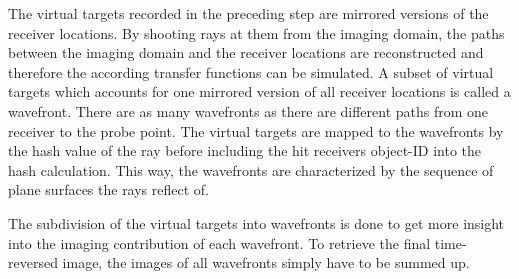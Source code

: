 The virtual targets recorded in the preceding step are mirrored versions of the receiver locations.
By shooting rays at them from the imaging domain, the paths between the imaging domain and the receiver locations are reconstructed and therefore the according transfer functions can be simulated.
A subset of virtual targets which accounts for one mirrored version of all receiver locations is called a wavefront.
There are as many wavefronts as there are different paths from one receiver to the probe point.
The virtual targets are mapped to the wavefronts by the hash value of the ray before including the hit receivers object-ID into the hash calculation.
This way, the wavefronts are characterized by the sequence of plane surfaces the rays reflect of.

The subdivision of the virtual targets into wavefronts is done to get more insight into the imaging contribution of each wavefront.
To retrieve the final time-reversed image, the images of all wavefronts simply have to be summed up.
